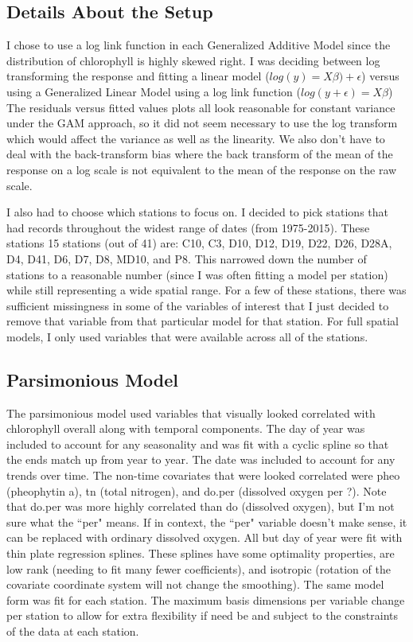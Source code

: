 \documentclass[12pt]{amsart}
\begin{document}
\subsection{Details About the Setup}
I chose to use a log link function in each Generalized Additive Model since the distribution of chlorophyll is highly skewed right. I was deciding between log transforming the response and fitting a linear model ($log(y)=X\beta)+\epsilon$) versus using a Generalized Linear Model using a log link function ($log(y+\epsilon)= X\beta$) The residuals versus fitted values plots all look reasonable for constant variance under the GAM approach, so it did not seem necessary to use the log transform which would affect the variance as well as the linearity. We also don't have to deal with the back-transform bias where the back transform of the mean of the response on a log scale is not equivalent to the mean of the response on the raw scale.

I also had to choose which stations to focus on. I decided to pick stations that had records throughout the widest range of dates (from 1975-2015). These stations 15 stations (out of 41) are: C10, C3, D10, D12, D19, D22, D26, D28A, D4, D41, D6, D7, D8, MD10, and P8. This narrowed down the number of stations to a reasonable number (since I was often fitting a model per station) while still representing a wide spatial range. For a few of these stations, there was sufficient missingness in some of the variables of interest that I just decided to remove that variable from that particular model for that station. For full spatial models, I only used variables that were available across all of the stations.


\subsection{Parsimonious Model}

The parsimonious model used variables that visually looked correlated with chlorophyll overall along with temporal components. The day of year was included to account for any seasonality and was fit with a cyclic spline so that the ends match up from year to year. The date was included to account for any trends over time. The non-time covariates that were looked correlated were pheo (pheophytin a), tn (total nitrogen), and do.per (dissolved oxygen per ?). Note that do.per was more highly correlated than do (dissolved oxygen), but I'm not sure what the ``per" means. If in context, the ``per" variable doesn't make sense, it can be replaced with ordinary dissolved oxygen. All but day of year were fit with thin plate regression splines. These splines have some optimality properties, are low rank (needing to fit many fewer coefficients), and isotropic (rotation of the covariate coordinate system will not change the smoothing). The same model form was fit for each station. The maximum basis dimensions per variable change per station to allow for extra flexibility if need be and subject to the constraints of the data at each station.  
\end{document}

